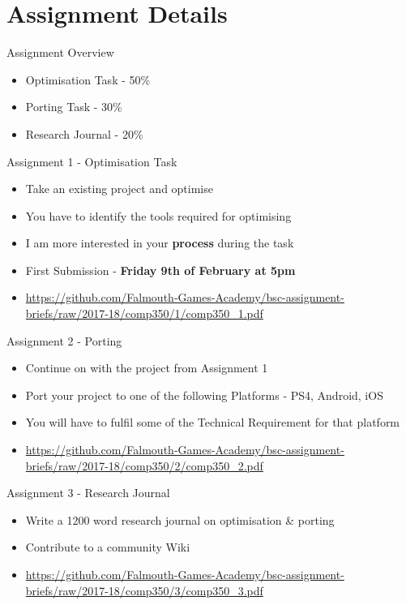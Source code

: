 \part{Assignment Details}
\frame{\partpage}

\begin{frame}{Assignment Overview}
	\begin{itemize}
		\item Optimisation Task - 50\%
		\item Porting Task - 30\%
		\item Research Journal  - 20\%
	\end{itemize}
\end{frame}

\begin{frame}{Assignment 1 - Optimisation Task}
	\begin{itemize}
		\item Take an existing project and optimise
		\item You have to identify the tools required for optimising
		\item I am more interested in your \textbf{process} during the task
		\item First Submission - \textbf{Friday 9th of February at 5pm}
		\item \url{https://github.com/Falmouth-Games-Academy/bsc-assignment-briefs/raw/2017-18/comp350/1/comp350_1.pdf}
	\end{itemize}
\end{frame}

\begin{frame}{Assignment 2 - Porting }
	\begin{itemize}
		\item Continue on with the project from Assignment 1
		\item Port your project to one of the following Platforms - PS4, Android, iOS
		\item You will have to fulfil some of the Technical Requirement for that platform
		\item \url{https://github.com/Falmouth-Games-Academy/bsc-assignment-briefs/raw/2017-18/comp350/2/comp350_2.pdf}
	\end{itemize}
\end{frame}

\begin{frame}{Assignment 3 - Research Journal }
	\begin{itemize}
		\item Write a 1200 word research journal on optimisation \& porting 
		\item Contribute to a community Wiki
		\item \url{https://github.com/Falmouth-Games-Academy/bsc-assignment-briefs/raw/2017-18/comp350/3/comp350_3.pdf}
	\end{itemize}
\end{frame}